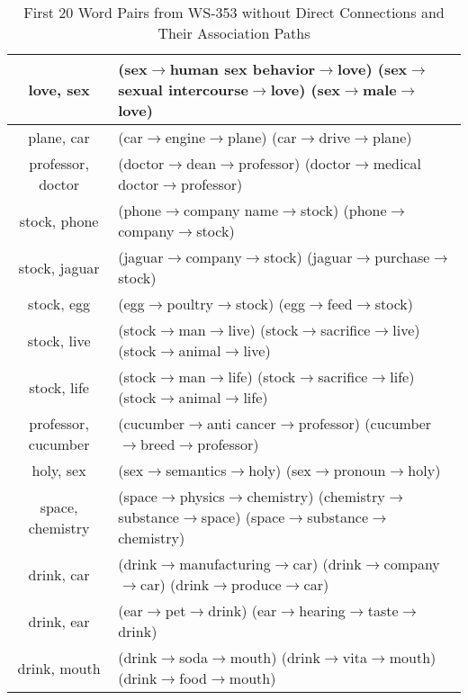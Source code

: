 \begin{table*}[th]
\caption{First 20 Word Pairs from WS-353 without Direct Connections and Their Association Paths}
\label{tab:20}
\small
\centering
\begin{tabular}{|c|l|} \hline 
love, sex&	(sex$\rightarrow$human sex behavior$\rightarrow$love) (sex$\rightarrow$sexual intercourse$\rightarrow$love)	(sex$\rightarrow$male$\rightarrow$love) \\ \hline
plane, car & (car$\rightarrow$engine$\rightarrow$plane) (car$\rightarrow$drive$\rightarrow$plane) \\ \hline
professor, doctor & (doctor$\rightarrow$dean$\rightarrow$professor) (doctor$\rightarrow$medical doctor$\rightarrow$professor) \\ \hline 
stock, phone & (phone$\rightarrow$company name$\rightarrow$stock)	(phone$\rightarrow$company$\rightarrow$stock) \\ \hline	
stock, jaguar& (jaguar$\rightarrow$company$\rightarrow$stock)	(jaguar$\rightarrow$purchase$\rightarrow$stock) \\ \hline
stock, egg& (egg$\rightarrow$poultry$\rightarrow$stock)	(egg$\rightarrow$feed$\rightarrow$stock) \\ \hline
stock, live& (stock$\rightarrow$man$\rightarrow$live)	(stock$\rightarrow$sacrifice$\rightarrow$live) (stock$\rightarrow$animal$\rightarrow$live) \\ \hline
stock, life& (stock$\rightarrow$man$\rightarrow$life)	(stock$\rightarrow$sacrifice$\rightarrow$life)	(stock$\rightarrow$animal$\rightarrow$life) \\ \hline
professor, cucumber& (cucumber$\rightarrow$anti cancer$\rightarrow$professor)	(cucumber$\rightarrow$breed$\rightarrow$professor) \\ \hline
holy, sex& (sex$\rightarrow$semantics$\rightarrow$holy)	(sex$\rightarrow$pronoun$\rightarrow$holy)\\ \hline	
space, chemistry&(space$\rightarrow$physics$\rightarrow$chemistry)	(chemistry$\rightarrow$substance$\rightarrow$space) (space$\rightarrow$substance$\rightarrow$chemistry)\\ \hline
drink, car& (drink$\rightarrow$manufacturing$\rightarrow$car)	(drink$\rightarrow$company$\rightarrow$car) (drink$\rightarrow$produce$\rightarrow$car)\\ \hline
drink, ear& (ear$\rightarrow$pet$\rightarrow$drink)	(ear$\rightarrow$hearing$\rightarrow$taste$\rightarrow$drink)\\ \hline
drink, mouth& (drink$\rightarrow$soda$\rightarrow$mouth)	(drink$\rightarrow$vita$\rightarrow$mouth)	(drink$\rightarrow$food$\rightarrow$mouth)\\ \hline

\end{tabular}
\end{table*}

